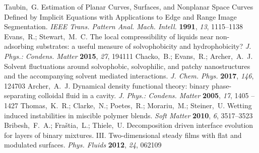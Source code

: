 \documentclass[journal=langd5,manuscript=article]{achemso}
\begin{document}
\begin{mcitethebibliography}{71}
{\mcitedefaultendpunct}{\mcitedefaultseppunct}\relax
\EndOfBibitem
{}
Taubin,~G. Estimation of Planar Curves, Surfaces, and Nonplanar Space Curves
  Defined by Implicit Equations with Applications to Edge and Range Image
  Segmentation. \emph{IEEE Trans. Pattern Anal. Mach. Intell.} \textbf{1991},
  \emph{13}, 1115--1138\relax
\mciteBstWouldAddEndPuncttrue
\mciteSetBstMidEndSepPunct{\mcitedefaultmidpunct}
{\mcitedefaultendpunct}{\mcitedefaultseppunct}\relax
\EndOfBibitem
{}
Evans,~R.; Stewart,~M.~C. The local compressibility of liquids near
  non-adsorbing substrates: a useful measure of solvophobicity and
  hydrophobicity? \emph{J. Phys.: Condens. Matter} \textbf{2015}, \emph{27},
  194111\relax
\mciteBstWouldAddEndPuncttrue
\mciteSetBstMidEndSepPunct{\mcitedefaultmidpunct}
{\mcitedefaultendpunct}{\mcitedefaultseppunct}\relax
\EndOfBibitem
{}
Chacko,~B.; Evans,~R.; Archer,~A.~J. Solvent fluctuations around solvophobic,
  solvophilic, and patchy nanostructures and the accompanying solvent mediated
  interactions. \emph{J. Chem. Phys.} \textbf{2017}, \emph{146}, 124703\relax
\mciteBstWouldAddEndPuncttrue
\mciteSetBstMidEndSepPunct{\mcitedefaultmidpunct}
{\mcitedefaultendpunct}{\mcitedefaultseppunct}\relax
\EndOfBibitem
{}
Archer,~A.~J. Dynamical density functional theory: binary phase-separating
  colloidal fluid in a cavity. \emph{J. Phys.: Condens. Matter} \textbf{2005},
  \emph{17}, 1405 -- 1427\relax
\mciteBstWouldAddEndPuncttrue
\mciteSetBstMidEndSepPunct{\mcitedefaultmidpunct}
{\mcitedefaultendpunct}{\mcitedefaultseppunct}\relax
\EndOfBibitem
{}
Thomas,~K.~R.; Clarke,~N.; Poetes,~R.; Morariu,~M.; Steiner,~U. Wetting induced
  instabilities in miscible polymer blends. \emph{Soft Matter} \textbf{2010},
  \emph{6}, 3517--3523\relax
\mciteBstWouldAddEndPuncttrue
\mciteSetBstMidEndSepPunct{\mcitedefaultmidpunct}
{\mcitedefaultendpunct}{\mcitedefaultseppunct}\relax
\EndOfBibitem
{}
Bribesh,~F.~A.; Fra{\v{s}}tia,~L.; Thiele,~U. Decomposition driven interface
  evolution for layers of binary mixtures. III. Two-dimensional steady films
  with flat and modulated surfaces. \emph{Phys. Fluids} \textbf{2012},
  \emph{24}, 062109\relax
\mciteBstWouldAddEndPuncttrue
\mciteSetBstMidEndSepPunct{\mcitedefaultmidpunct}

\end{mcitethebibliography}
\end{document}
